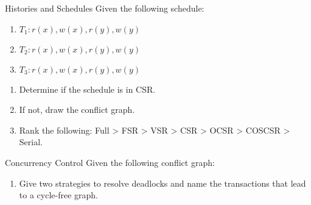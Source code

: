 \documentclass{article}
\author{Leopold Lemmermann}
\begin{document}
\createtitle

\begin{exercise}{Histories and Schedules}
  Given the following schedule:
  \begin{enumerate}
    \item $T_1: r(x), w(x), r(y), w(y)$
    \item $T_2: r(x), w(x), r(y), w(y)$
    \item $T_3: r(x), w(x), r(y), w(y)$
  \end{enumerate}

  \begin{enumerate}
    \item Determine if the schedule is in CSR.
    \item If not, draw the conflict graph.
    \item Rank the following: Full > FSR > VSR > CSR > OCSR > COSCSR > Serial.
  \end{enumerate}

  \begin{solution}
  \end{solution}
\end{exercise}


\begin{exercise}{Concurrency Control}
  Given the following conflict graph:

  \begin{enumerate}
    \item Give two strategies to resolve deadlocks and name the transactions that lead to a cycle-free graph.
  \end{enumerate}

  \begin{solution}
  \end{solution}
\end{exercise}
\end{document}
